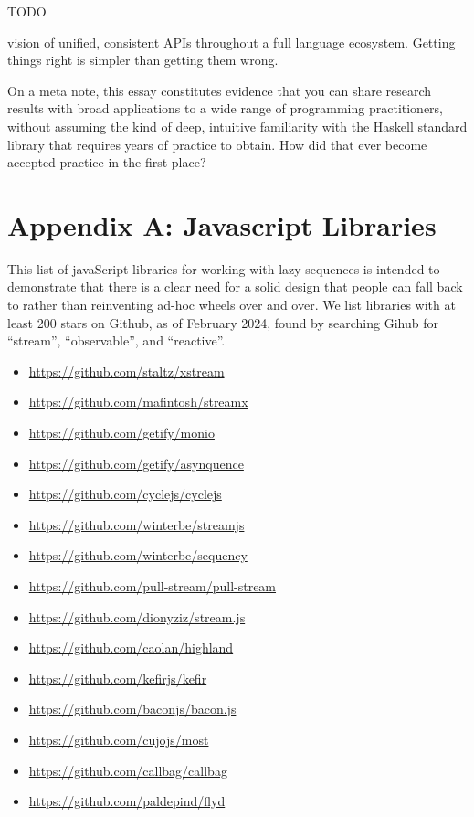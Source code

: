 \documentclass[sigplan,screen,10pt,anonymous,review]{acmart}
\begin{document}
TODO

vision of unified, consistent APIs throughout a full language ecosystem. Getting things right is simpler than getting them wrong.

On a meta note, this essay constitutes evidence that you can share research results with broad applications to a wide range of programming practitioners, without assuming the kind of deep, intuitive familiarity with the Haskell standard library that requires years of practice to obtain. How did that ever become accepted practice in the first place?

\section{Appendix A: Javascript Libraries}\label{wtfjs}

This list of javaScript libraries for working with lazy sequences is intended to demonstrate that there is a clear need for a solid design that people can fall back to rather than reinventing ad-hoc wheels over and over. We list libraries with at least 200 stars on Github, as of February 2024, found by searching Gihub for ``stream'', ``observable'', and ``reactive''.

\begin{itemize}
    \item \url{https://github.com/staltz/xstream}
    \item \url{https://github.com/mafintosh/streamx}
    \item \url{https://github.com/getify/monio}
    \item \url{https://github.com/getify/asynquence}
    \item \url{https://github.com/cyclejs/cyclejs}
    \item \url{https://github.com/winterbe/streamjs}
    \item \url{https://github.com/winterbe/sequency}
    \item \url{https://github.com/pull-stream/pull-stream}
    \item \url{https://github.com/dionyziz/stream.js}
    \item \url{https://github.com/caolan/highland}
    \item \url{https://github.com/kefirjs/kefir}
    \item \url{https://github.com/baconjs/bacon.js}
    \item \url{https://github.com/cujojs/most}
    \item \url{https://github.com/callbag/callbag}
    \item \url{https://github.com/paldepind/flyd}
\end{itemize}
    
\end{document}
